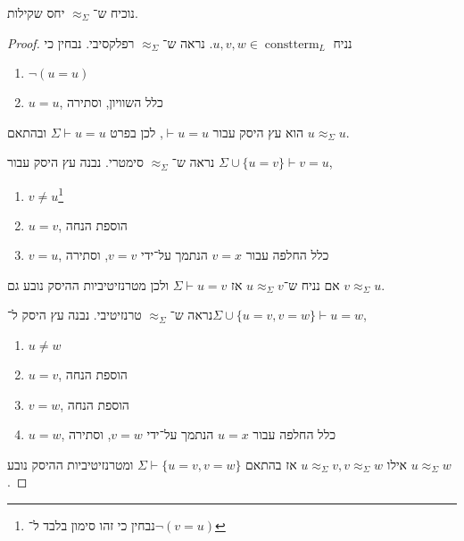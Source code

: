 \subquestion{}
נוכיח ש־$\approx_\Sigma$ יחס שקילות.
\begin{proof}
	נניח $u, v, w \in \operatorname{constterm}_L$.
	נראה ש־$\approx_\Sigma$ רפלקסיבי.
	נבחין כי
	\begin{enumerate}
		\item $\lnot (u = u)$
		\item $u = u$, כלל השוויון, וסתירה
	\end{enumerate}
	הוא עץ היסק עבור $\vdash u = u$, לכן בפרט $\Sigma \vdash u = u$ ובהתאם $u \approx_\Sigma u$.

	נראה ש־$\approx_\Sigma$ סימטרי.
	נבנה עץ היסק עבור $\Sigma \cup \{ u = v \} \vdash v = u$,
	\begin{enumerate}
		\item $v \ne u$\footnote{נבחין כי זהו סימון בלבד ל־$\lnot (v = u)$}
		\item $u = v$, הוספת הנחה
		\item $v = u$, כלל החלפה עבור $v = x$ הנתמך על־ידי $v = v$, וסתירה
	\end{enumerate}
	אם נניח ש־$u \approx_\Sigma v$ אז $\Sigma \vdash u = v$ ולכן מטרנזיטיביות ההיסק נובע גם $v \approx_\Sigma u$.

	נראה ש־$\approx_\Sigma$ טרנזיטיבי.
	נבנה עץ היסק ל־$\Sigma \cup \{ u = v, v = w \} \vdash u = w$,
	\begin{enumerate}
		\item $u \ne w$
		\item $u = v$, הוספת הנחה
		\item $v = w$, הוספת הנחה
		\item $u = w$, כלל החלפה עבור $u = x$ הנתמך על־ידי $v = w$, וסתירה
	\end{enumerate}
	אילו $u \approx_\Sigma v, v \approx_\Sigma w$ אז בהתאם $\Sigma \vdash \{ u = v, v = w \}$ ומטרנזיטיביות ההיסק נובע $u \approx_\Sigma w$.
\end{proof}

